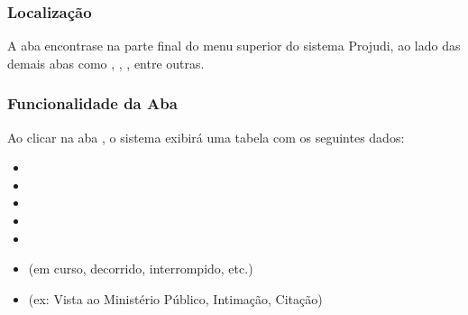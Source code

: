 \documentclass[letterpaper,10pt,brazil]{sphinxmanual}
\begin{document}
\subsubsection{Localização}
\label{\detokenize{projud_60_contagemprazosprocessuais:localizacao}}
\sphinxAtStartPar
A aba  encontra\sphinxhyphen{}se na parte final do menu superior do sistema Projudi, ao lado das demais abas como , , , entre outras.


\subsubsection{Funcionalidade da Aba}
\label{\detokenize{projud_60_contagemprazosprocessuais:funcionalidade-da-aba}}
\sphinxAtStartPar
Ao clicar na aba , o sistema exibirá uma tabela com os seguintes dados:
\begin{itemize}
\item {} 
\sphinxAtStartPar
{}

\item {} 
\sphinxAtStartPar
{}

\item {} 
\sphinxAtStartPar
{}

\item {} 
\sphinxAtStartPar
{}

\item {} 
\sphinxAtStartPar
{}

\item {} 
\sphinxAtStartPar
{} (em curso, decorrido, interrompido, etc.)

\item {} 
\sphinxAtStartPar
{} (ex: Vista ao Ministério Público, Intimação, Citação)

\end{itemize}
\end{document}
